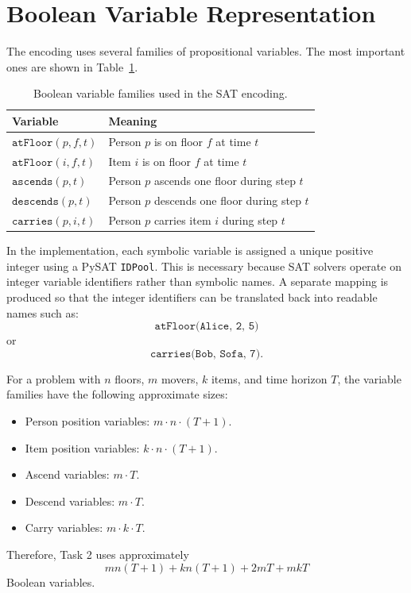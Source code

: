 \section{Boolean Variable Representation} \label{sec:boolean-variable-representation}
The encoding uses several families of propositional variables.
The most important ones are shown in Table~\ref{tab:variables}.

\begin{table}[H]
    \centering
    \begin{tabular}{ll}
        \toprule
        \textbf{Variable}         & \textbf{Meaning}                              \\
        \midrule
        $\texttt{atFloor}(p,f,t)$ & Person $p$ is on floor $f$ at time $t$        \\
        $\texttt{atFloor}(i,f,t)$ & Item $i$ is on floor $f$ at time $t$          \\
        $\texttt{ascends}(p,t)$   & Person $p$ ascends one floor during step $t$  \\
        $\texttt{descends}(p,t)$  & Person $p$ descends one floor during step $t$ \\
        $\texttt{carries}(p,i,t)$ & Person $p$ carries item $i$ during step $t$   \\
        \bottomrule
    \end{tabular}
    \caption{Boolean variable families used in the SAT encoding.}
    \label{tab:variables}
\end{table}

\noindent In the implementation, each symbolic variable is assigned a unique positive integer using a PySAT \texttt{IDPool}.
This is necessary because SAT solvers operate on integer variable identifiers rather than symbolic names.
A separate mapping is produced so that the integer identifiers can be translated back into readable names such as:
\[
    \texttt{atFloor(Alice, 2, 5)}
\]
or
\[
    \texttt{carries(Bob, Sofa, 7)}.
\]

\noindent For a problem with $n$ floors, $m$ movers, $k$ items, and time horizon $T$, the variable families have the following approximate sizes:

\begin{itemize}
    \item Person position variables: $m \cdot n \cdot (T+1)$.
    \item Item position variables: $k \cdot n \cdot (T+1)$.
    \item Ascend variables: $m \cdot T$.
    \item Descend variables: $m \cdot T$.
    \item Carry variables: $m \cdot k \cdot T$.
\end{itemize}

Therefore, Task 2 uses approximately
\[
    m n (T+1) + k n (T+1) + 2mT + mkT
\]
Boolean variables.